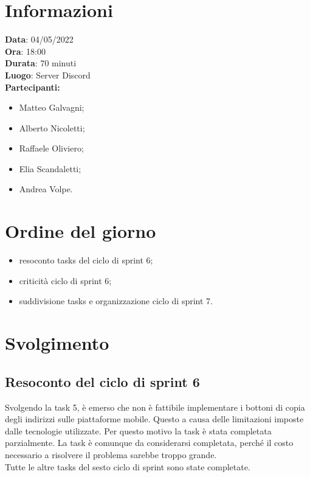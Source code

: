 \documentclass[a4paper, 12pt]{article}
\begin{document}
\makefrontpage

\section{Informazioni}
\textbf{Data}: 04/05/2022\\
\textbf{Ora}: 18:00\\
\textbf{Durata}: 70 minuti\\
\textbf{Luogo}: Server Discord\\

\textbf{Partecipanti:}
\begin{itemize}
	\item Matteo Galvagni;
	\item Alberto Nicoletti;
	\item Raffaele Oliviero;
	\item Elia Scandaletti;
	\item Andrea Volpe.
\end{itemize}


\section{Ordine del giorno}
\begin{itemize}
	\item resoconto tasks del ciclo di sprint 6;
  \item criticità ciclo di sprint 6;
	\item suddivisione tasks e organizzazione ciclo di sprint 7.
\end{itemize}

\section{Svolgimento}

\subsection{Resoconto del ciclo di sprint 6}
Svolgendo la task 5, è emerso che non è fattibile implementare i bottoni di copia degli indirizzi sulle piattaforme mobile. Questo a causa delle limitazioni imposte dalle tecnologie utilizzate. Per questo motivo la task è stata completata parzialmente. La task è comunque da considerarsi completata, perché il costo necessario a risolvere il problema sarebbe troppo grande. \\
Tutte le altre tasks del sesto ciclo di sprint sono state completate.
\end{document}
